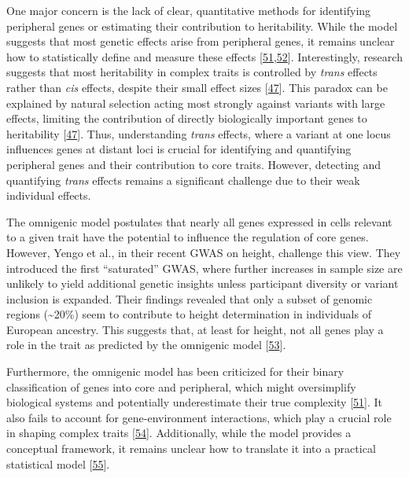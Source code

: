 One major concern is the lack of clear, quantitative methods for identifying peripheral genes or estimating their contribution to heritability.
While the model suggests that most genetic effects arise from peripheral genes, it remains unclear how to statistically define and measure these effects {[}\protect\hyperlink{ref-82fs3SZo}{51},\protect\hyperlink{ref-javtAG7r}{52}{]}.
Interestingly, research suggests that most heritability in complex traits is controlled by \emph{trans} effects rather than \emph{cis} effects, despite their small effect sizes {[}\protect\hyperlink{ref-LXvTZzEA}{47}{]}.
This paradox can be explained by natural selection acting most strongly against variants with large effects, limiting the contribution of directly biologically important genes to heritability {[}\protect\hyperlink{ref-LXvTZzEA}{47}{]}.
Thus, understanding \emph{trans} effects, where a variant at one locus influences genes at distant loci is crucial for identifying and quantifying peripheral genes and their contribution to core traits.
However, detecting and quantifying \emph{trans} effects remains a significant challenge due to their weak individual effects.

The omnigenic model postulates that nearly all genes expressed in cells relevant to a given trait have the potential to influence the regulation of core genes.
However, Yengo et al., in their recent GWAS on height, challenge this view.
They introduced the first ``saturated'' GWAS, where further increases in sample size are unlikely to yield additional genetic insights unless participant diversity or variant inclusion is expanded.
Their findings revealed that only a subset of genomic regions (\textasciitilde20\%) seem to contribute to height determination in individuals of European ancestry.
This suggests that, at least for height, not all genes play a role in the trait as predicted by the omnigenic model {[}\protect\hyperlink{ref-HFRaLwGQ}{53}{]}.

Furthermore, the omnigenic model has been criticized for their binary classification of genes into core and peripheral, which might oversimplify biological systems and potentially underestimate their true complexity {[}\protect\hyperlink{ref-82fs3SZo}{51}{]}.
It also fails to account for gene-environment interactions, which play a crucial role in shaping complex traits {[}\protect\hyperlink{ref-dg9nKuy0}{54}{]}.
Additionally, while the model provides a conceptual framework, it remains unclear how to translate it into a practical statistical model {[}\protect\hyperlink{ref-1GlQtJ9Yz}{55}{]}.

